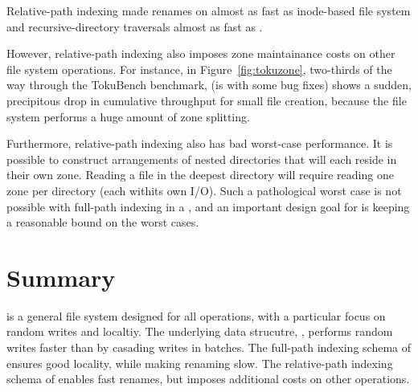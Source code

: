 Relative-path indexing made renames on \betrfsTwo almost as fast as inode-based
file system and recursive-directory traversals almost as fast as \betrfsOne.

However, relative-path indexing also imposes zone maintainance costs on other
file system operations.
For instance, in Figure~\ref{fig:tokuzone}, two-thirds of the way through the
TokuBench benchmark, \betrfsThree (\betrfsThree is \betrfsTwo with some bug
fixes) shows a sudden, precipitous drop in cumulative
throughput for small file creation, because the file system performs a huge
amount of zone splitting.

Furthermore, relative-path indexing also has bad worst-case performance.
It is possible to construct arrangements of nested directories that will each
reside in their own zone.
Reading a file in the deepest directory will require reading one zone per
directory (each withits own I/O).
Such a pathological worst case is not possible with full-path indexing in a
\bet, and an important design goal for \betrfs is keeping a reasonable bound on
the worst cases.

\section{Summary}

\betrfs is a general file system designed for all operations, with a particular
focus on random writes and localtiy.
The underlying data strucutre, \bets, performs random writes faster than \btrees
by casading writes in batches.
The full-path indexing schema of \betrfsOne ensures good locality, while making
renaming slow.
The relative-path indexing schema of \betrfsTwo enables fast renames,
but imposes additional costs on other operations.

